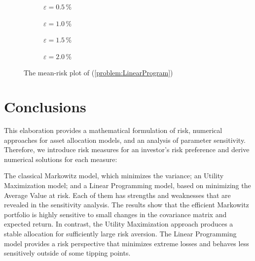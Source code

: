 \documentclass[a4paper, english, 11pt, onecolumn, oneside, final]{article}
\numberwithin{equation}{section}   %
\theoremstyle{plain}
\theoremstyle{definition}
\theoremstyle{remark}
\begin{document}
\begin{figure}[h]
\centering
    \begin{subfigure}{0.5\linewidth}
    
    \caption{$\varepsilon = 0.5\,\%$}
    \end{subfigure}\hfill
    \begin{subfigure}{0.5\linewidth}
    
    \caption{$\varepsilon = 1.0\,\%$}
    \end{subfigure}

    \begin{subfigure}{0.5\linewidth}
    
    \caption{$\varepsilon = 1.5\,\%$}
    \end{subfigure}\hfill
    \begin{subfigure}{0.5\linewidth}
    
    \caption{$\varepsilon = 2.0\,\%$}
    \end{subfigure}
\caption{The mean-risk plot of (\ref{problem:LinearProgram})}
\label{fig:plotMeanRiskMeasureLinearProgramming}
\end{figure}
\newpage

\section{Conclusions}

This elaboration provides a mathematical formulation of risk, numerical approaches for asset allocation models, and an analysis of parameter sensitivity. Therefore, we introduce risk measures for an investor's risk preference and derive numerical solutions for each measure:

\medskip The classical Markowitz model, which minimizes the variance; an Utility Maximization model; and a Linear Programming model, based on minimizing the Average Value at risk. Each of them has strengths and weaknesses that are revealed in the sensitivity analysis. The results show that the efficient Markowitz portfolio is highly sensitive to small changes in the covariance matrix and expected return. In contrast, the Utility Maximization approach produces a stable allocation for sufficiently large risk aversion. The Linear Programming model provides a risk perspective that minimizes extreme losses and behaves less sensitively outside of some tipping points.
\end{document}
